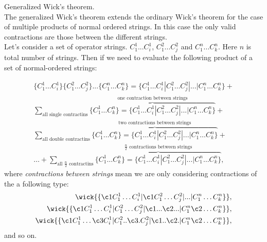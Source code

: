 \documentclass[twoside,english]{uiofysmaster}
\theoremstyle{definition}
\begin{document}
\begin{theorem} Generalized Wick's theorem.\\
The generalized Wick's theorem extends the ordinary Wick's theorem for the case of multiple products of normal ordered strings. In this case the only valid contractions are those between the different strings.\\
Let's consider a set of operator strings. $C^1_1 ...C^1_i$, $C^2_1 ...C^2_j$ and $C^n_1 ...C^n_k$. Here $n$ is total number of strings. Then if we need to evaluate the following product of a set of normal-ordered strings:

\begin{align}
\{C_1^1 \dots C_i^1\}\{C_1^2 \dots C_j^2\} ... \{C_1^n \dots C_k^n\} = \{C_1^1 \dots C_i^1|C_1^2 \dots C_j^2| ...| C_1^n \dots C_k^n\} + \nonumber \\
\sum_{\text{all single contractins}} \overbrace{ \{C_1^1 \dots C_k^n\}= \{C_1^1 \dots C_i^1|C_1^2 \dots C_j^2| ...| C_1^n \dots C_k^n\} }^\text{one contraction between strings} + \nonumber \\ \sum_{\text{all double contractins}} \overbrace{ \{C_1^1 \dots C_k^n\}= \{C_1^1 \dots C_i^1|C_1^2 \dots C_j^2| ...| C_1^n \dots C_k^n\} }^\text{two contractions between strings}+\nonumber \\ \dots + 
\sum_{\text{all $\frac{n}{2}$ contractins}} \overbrace{ \{C_1^1 \dots C_k^n\}= \{C_1^1 \dots C_i^1|C_1^2 \dots C_j^2| ...| C_1^n \dots C_k^n\} }^\text{$\frac{n}{2}$ contractions  between strings},
\end{align}
where \textit{contractions between strings} mean we are only considering contractions of the a following type:
	\begin{align}
	\wick{\{\c1 C_1^1 \dots C_i^1|\c1 C_1^2 \dots C_j^2| ...| C_1^n \dots C_k^n\}},\\
	\wick{\{\c1 C_1^1 \dots  C_i^1|  C_1^2 \dots C_j^2|\c1 ... \c2... | C_1^n \c2 \dots C_k^n\}},\\
	\wick{\{\c1 C_1^1 \dots \c3 C_i^1|   C_1^2 ..\c3. C_j^2|\c1 .. \c2. | C_1^n \c2 \dots C_k^n\}},
	\end{align}
	and so on. 
\end{theorem}

 
\end{document}
